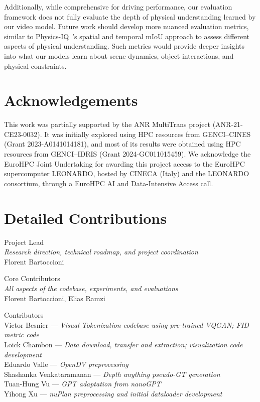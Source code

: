 Additionally, while comprehensive for driving performance, our evaluation framework does not fully evaluate the depth of physical understanding learned by our video model. Future work should develop more nuanced evaluation metrics, similar to Physics-IQ~\cite{motamed2025physicsIQ}'s spatial and temporal mIoU approach to assess different aspects of physical understanding. Such metrics would provide deeper insights into what our models learn about scene dynamics, object interactions, and physical constraints.


\section*{Acknowledgements}
\label{sec:acknowledgment}
This work was partially supported by the ANR MultiTrans project (ANR-21-CE23-0032). It was initially explored using HPC resources from GENCI–CINES (Grant 2023-A0141014181), and most of its results were obtained using HPC resources from GENCI–IDRIS (Grant 2024-GC011015459). We acknowledge the EuroHPC Joint Undertaking for awarding this project access to the EuroHPC supercomputer LEONARDO, hosted by CINECA (Italy) and the LEONARDO consortium, through a EuroHPC AI and Data-Intensive Access call.

\clearpage

\section*{Detailed Contributions}
\label{sec:credits}

{\sc Project Lead} \\
\textit{\small Research direction, technical roadmap, and project coordination} \\
Florent Bartoccioni

{\sc Core Contributors} \\
\textit{\small All aspects of the codebase, experiments, and evaluations} \\
Florent Bartoccioni, Elias Ramzi

{\sc Contributors} \\
Victor Besnier --- \textit{\small Visual Tokenization codebase using pre-trained VQGAN; FID metric code}\\
Loick Chambon --- \textit{\small Data download, transfer and extraction; visualization code development}\\
Eduardo Valle --- \textit{\small OpenDV preprocessing}\\
Shashanka Venkataramanan --- \textit{\small Depth anything pseudo-GT generation}\\
Tuan-Hung Vu --- \textit{\small GPT adaptation from nanoGPT}\\
Yihong Xu --- \textit{\small nuPlan preprocessing and initial dataloader development}

